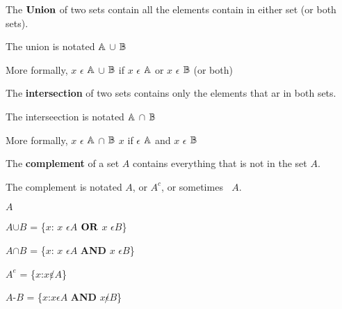\documentclass{report}
\begin{document}
{
%
%
%
%
%

}

{
    The $\bf Union$ of two sets contain all the elements contain in either set (or both sets).

    The union is notated $\mathbb{A}$ $\cup$ $\mathbb{B}$

    More formally, $x$ $\epsilon$ $\mathbb{A}$ $\cup$ $\mathbb{B}$ if $x$ $\epsilon$ $\mathbb{A}$ or $x$ $\epsilon$ $\mathbb{B}$ (or both)

    The {\bf intersection} of two sets contains only the elements that ar in both sets.

    The interseection is notated $\mathbb{A}$ $\cap$ $\mathbb{B}$

    More formally, $x$ $\epsilon$ $\mathbb{A}$ $\cap$ $\mathbb{B}$ $x$ if $\epsilon$ $\mathbb{A}$ and $x$ $\epsilon$ $\mathbb{B}$

    The {\bf complement} of a set $A$ contains everything that is not in the set $A$.

    The complement is notated $A$, or $A^c$, or sometimes $~$ $A$.


    $A$

    $A$$\cup$$B$ = \{$x$: $x$ $\epsilon${$A$} $\bf OR$ $x$ $\epsilon${$B$}\}
    
    $A$$\cap$$B$ = \{$x$: $x$ $\epsilon${$A$} {\bf AND} $x$ $\epsilon${$B$}\}
    
    $A^e$ = \{$x$:{$x$}$\not\varepsilon${$A$}\}

    $A${-}$B$ = \{$x$:{$x$}$\epsilon${$A$} {\bf AND} $x${$\not\epsilon$}{$B$}\}

}
\end{document}
